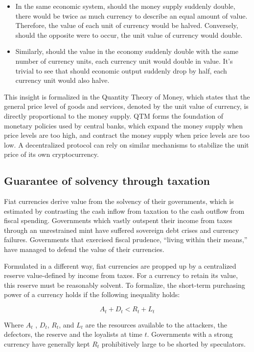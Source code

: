 \documentclass{article}
\begin{document}
\begin{itemize}
    \item In the same economic system, should the money supply suddenly double, there would be twice as much currency to describe an equal amount of value. Therefore, the value of each unit of currency would be halved. Conversely, should the opposite were to occur, the unit value of currency would double. 
    \item Similarly, should the value in the economy suddenly double with the same number of currency units, each currency unit would double in value. It's trivial to see that should economic output suddenly drop by half, each currency unit would also halve.
\end{itemize}

This insight is formalized in the Quantity Theory of Money, which states that the general price level of goods and services, denoted by the unit value of currency, is directly proportional to the money supply. QTM forms the foundation of monetary policies used by central banks, which expand the money supply when price levels are too high, and contract the money supply when price levels are too low. A decentralized protocol can rely on similar mechanisms to stabilize the unit price of its own cryptocurrency.  

\subsection{Guarantee of solvency through taxation}

Fiat currencies derive value from the solvency of their governments, which is estimated by contrasting the cash inflow from taxation to the cash outflow from fiscal spending. Governments which vastly outspent their income from taxes through an unrestrained mint have suffered sovereign debt crises and currency failures. Governments that exercised fiscal prudence, “living within their means,” have managed to defend the value of their currencies. 

Formulated in a different way, fiat currencies are propped up by a centralized reserve value-defined by income from taxes. For a currency to retain its value, this reserve must be reasonably solvent. To formalize, the short-term purchasing power of a currency holds if the following inequality holds: 

$$A_t + D_t < R_t + L_t$$ 

Where $A_t$ , $D_t$, $R_t$, and $L_t$ are the resources available to the attackers, the defectors, the reserve and the loyalists at time $t$. Governments with a strong currency have generally kept $R_t$ prohibitively large to be shorted by speculators. 
\end{document}
